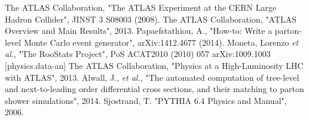 \documentclass[10pt]{ucscthesisbs}
\begin{document}
\begin{thebibliography}{999}
The ATLAS Collaboration, "The ATLAS Experiment at the CERN Large Hadron Collider", JINST 3 S08003 (2008).
The ATLAS Collaboration, "ATLAS Overview and Main Results", 2013.
Papaefstathiou, A., "How-to: Write a parton-level Monte Carlo event generator", arXiv:1412.4677 (2014).
Moneta, Lorenzo \textit{et al.}, "The RooStats Project", PoS ACAT2010 (2010) 057 arXiv:1009.1003 [physics.data-an]
The ATLAS Collaboration, "Physics at a High-Luminosity LHC with ATLAS", 2013.
Alwall, J., \textit{et al.}, "The automated computation of tree-level and next-to-leading order differential cross sections, and their matching to parton shower simulations", 2014.
Sjostrand, T. "PYTHIA 6.4 Physics and Manual", 2006.
\end{thebibliography}
\end{document}
